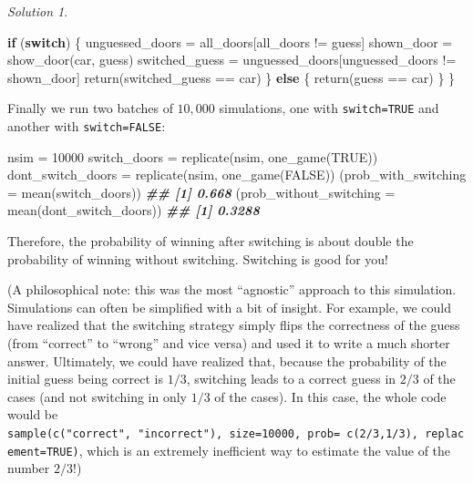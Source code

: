 \documentclass[
]{book}
\newenvironment{Shaded}{\begin{snugshade}}{\end{snugshade}}
\newcommand{\AttributeTok}[1]{\textcolor[rgb]{0.77,0.63,0.00}{#1}}
\newcommand{\ConstantTok}[1]{\textcolor[rgb]{0.00,0.00,0.00}{#1}}
\newcommand{\ControlFlowTok}[1]{\textcolor[rgb]{0.13,0.29,0.53}{\textbf{#1}}}
\newcommand{\DecValTok}[1]{\textcolor[rgb]{0.00,0.00,0.81}{#1}}
\newcommand{\DocumentationTok}[1]{\textcolor[rgb]{0.56,0.35,0.01}{\textbf{\textit{#1}}}}
\newcommand{\FunctionTok}[1]{\textcolor[rgb]{0.00,0.00,0.00}{#1}}
\newcommand{\NormalTok}[1]{#1}
\newcommand{\OtherTok}[1]{\textcolor[rgb]{0.56,0.35,0.01}{#1}}
\newcommand{\SpecialCharTok}[1]{\textcolor[rgb]{0.00,0.00,0.00}{#1}}
\theoremstyle{definition}
\theoremstyle{definition}
\theoremstyle{definition}
\theoremstyle{definition}
\theoremstyle{remark}
\newtheorem*{solution}{Solution}
\begin{document}
\begin{solution}
\begin{Shaded}
\begin{Highlighting}[]
    \ControlFlowTok{if}\NormalTok{ (}\ControlFlowTok{switch}\NormalTok{) \{}
\NormalTok{        unguessed\_doors }\OtherTok{=}\NormalTok{ all\_doors[all\_doors }\SpecialCharTok{!=}\NormalTok{ guess]}
\NormalTok{        shown\_door }\OtherTok{=} \FunctionTok{show\_door}\NormalTok{(car, guess)}
\NormalTok{        switched\_guess }\OtherTok{=}\NormalTok{ unguessed\_doors[unguessed\_doors }\SpecialCharTok{!=}\NormalTok{ shown\_door]}
        \FunctionTok{return}\NormalTok{(switched\_guess }\SpecialCharTok{==}\NormalTok{ car)}
\NormalTok{    \} }\ControlFlowTok{else}\NormalTok{ \{}
        \FunctionTok{return}\NormalTok{(guess }\SpecialCharTok{==}\NormalTok{ car)}
\NormalTok{    \}}
\NormalTok{\}}
\end{Highlighting}
\end{Shaded}

Finally we run two batches of \(10,000\) simulations, one with \texttt{switch=TRUE} and another with \texttt{switch=FALSE}:

\begin{Shaded}
\begin{Highlighting}[]
\NormalTok{nsim }\OtherTok{=} \DecValTok{10000}
\NormalTok{switch\_doors }\OtherTok{=} \FunctionTok{replicate}\NormalTok{(nsim, }\FunctionTok{one\_game}\NormalTok{(}\ConstantTok{TRUE}\NormalTok{))}
\NormalTok{dont\_switch\_doors }\OtherTok{=} \FunctionTok{replicate}\NormalTok{(nsim, }\FunctionTok{one\_game}\NormalTok{(}\ConstantTok{FALSE}\NormalTok{))}
\NormalTok{(}\AttributeTok{prob\_with\_switching =} \FunctionTok{mean}\NormalTok{(switch\_doors))}
\DocumentationTok{\#\# [1] 0.668}
\NormalTok{(}\AttributeTok{prob\_without\_switching =} \FunctionTok{mean}\NormalTok{(dont\_switch\_doors))}
\DocumentationTok{\#\# [1] 0.3288}
\end{Highlighting}
\end{Shaded}

Therefore, the probability of winning after switching is about double the probability of winning without switching. Switching is good for you!

(A philosophical note: this was the most ``agnostic'' approach to this simulation. Simulations can often be simplified with a bit of insight. For example, we could have realized that the switching strategy simply flips the correctness of the guess (from ``correct'' to ``wrong'' and vice versa) and used it to write a much shorter answer. Ultimately, we could have realized that, because the probability of the initial guess being correct is \(1/3\), switching leads to a correct guess in \(2/3\) of the cases (and not switching in only \(1/3\) of the cases). In this case, the whole code would be \texttt{sample(c("correct",\ "incorrect"),\ size=10000,\ prob=\ c(2/3,1/3),\ replacement=TRUE)}, which is an extremely inefficient way to estimate the value of the number \(2/3\)!)
\end{solution}
\end{document}
